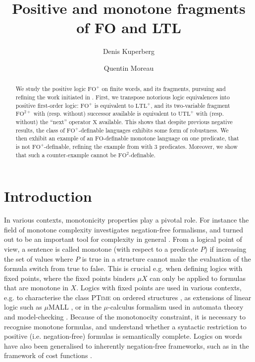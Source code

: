 \documentclass[a4paper,UKenglish,cleveref, autoref, thm-restate]{lipics-v2021}
\title{Positive and monotone fragments of FO and LTL}
\author{Denis Kuperberg}{CNRS, LIP, ENS Lyon, France \and \url{http://perso.ens-lyon.fr/denis.kuperberg} }{denis.kuperberg@ens-lyon.fr}{https://orcid.org/0000-0001-5406-717X}{ANR ReCiProg}
\author{Quentin Moreau}{ENS Lyon, France}{quentin.moreau@ens-lyon.fr}{}{}
\newcommand{\FO}{\mathrm{FO}}
\newcommand{\FOp}{\FO^+}
\newcommand{\FOtw}{\FO^2}
\newcommand{\FOtwp}{\FO^{2+}}
\newcommand{\LTL}{\mathrm{LTL}}
\newcommand{\LTLp}{\LTL^+}
\newcommand{\UTL}{\mathrm{UTL}}
\newcommand{\UTLp}{\UTL^+}
\newcommand{\X}{\mathrm{X}}
\begin{document}
\maketitle



\begin{abstract}
    We study the positive logic $\FOp$ on finite words, and its fragments, pursuing and refining the work initiated in \cite{PFO}.
    First, we transpose notorious logic equivalences into positive first-order logic: $\FOp$ is equivalent to $\LTLp$, and its two-variable fragment $\FOtwp$ with (resp. without) successor available is equivalent to $\UTLp$ with (resp. without) the ``next'' operator $\X$ available.  This shows that despite previous negative results, the class of $\FOp$-definable languages exhibits some form of robustness.
    We then exhibit an example of an $\FO$-definable monotone language on one predicate, that is not $\FOp$-definable, refining the example from \cite{PFO} with $3$ predicates. 
    Moreover, we show that such a counter-example cannot be $\FOtw$-definable. 


\end{abstract}




\section{Introduction}

In various contexts, monotonicity properties play a pivotal role. For instance the field of monotone complexity investigates negation-free formalisms, and turned out to be an important tool for complexity in general \cite{GrigniSipser92}.
From a logical point of view, a sentence is called monotone (with respect to a predicate $P$) if increasing the set of values where $P$ is true in a structure cannot make the evaluation of the formula switch from true to false. This is crucial e.g. when defining logics with fixed points, where the fixed points binders $\mu X$ can only be applied to formulas that are monotone in $X$. Logics with fixed points are used in various contexts, e.g. to characterise the class \textsc{PTime} on ordered structures \cite{Immerman,Vardi}, as extensions of linear logic such as $\mu$MALL \cite{muMALL}, or in the $\mu$-calculus formalism used in automata theory and model-checking \cite{mucalc}. Because of the monotonocity constraint, it is necessary to recognise monotone formulas, and understand whether a syntactic restriction to positive (i.e. negation-free) formulas is semantically complete.
Logics on words have also been generalised to inherently negation-free frameworks, such as in the framework of cost functions \cite{CostFun}.
\end{document}
